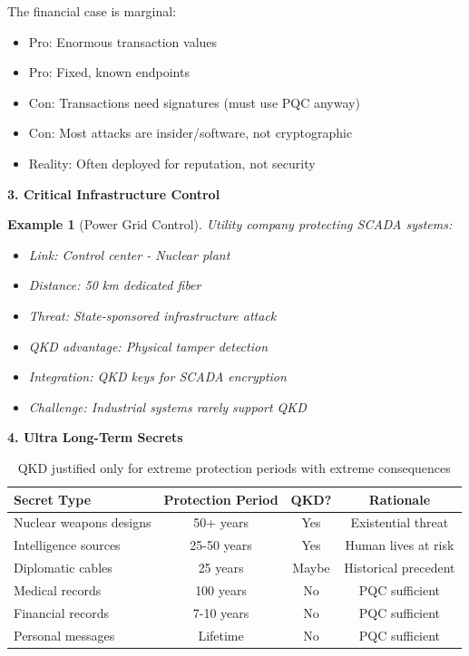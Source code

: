 \documentclass[11pt,a4paper]{article}
\newtheorem{example}{Example}
\begin{document}
The financial case is marginal:
\begin{itemize}
    \item Pro: Enormous transaction values
    \item Pro: Fixed, known endpoints
    \item Con: Transactions need signatures (must use PQC anyway)
    \item Con: Most attacks are insider/software, not cryptographic
    \item Reality: Often deployed for reputation, not security
\end{itemize}

\textbf{3. Critical Infrastructure Control}

\begin{example}[Power Grid Control]
Utility company protecting SCADA systems:
\begin{itemize}
    \item Link: Control center - Nuclear plant
    \item Distance: 50 km dedicated fiber
    \item Threat: State-sponsored infrastructure attack
    \item QKD advantage: Physical tamper detection
    \item Integration: QKD keys for SCADA encryption
    \item Challenge: Industrial systems rarely support QKD
\end{itemize}
\end{example}

\textbf{4. Ultra Long-Term Secrets}

\begin{table}[h]
\centering
\begin{tabular}{|l|c|c|c|}
\hline
\textbf{Secret Type} & \textbf{Protection Period} & \textbf{QKD?} & \textbf{Rationale} \\
\hline
Nuclear weapons designs & 50+ years & Yes & Existential threat \\
Intelligence sources & 25-50 years & Yes & Human lives at risk \\
Diplomatic cables & 25 years & Maybe & Historical precedent \\
Medical records & 100 years & No & PQC sufficient \\
Financial records & 7-10 years & No & PQC sufficient \\
Personal messages & Lifetime & No & PQC sufficient \\
\hline
\end{tabular}
\caption{QKD justified only for extreme protection periods with extreme consequences}
\end{table}
\end{document}

